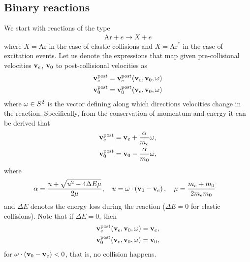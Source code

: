 \documentclass{article}[draft]
\begin{document}
\subsection{Binary reactions}
\label{subsec:binary_reactions}
We start with reactions of the type
\begin{align*}
\text{Ar} + e \longrightarrow X + e
\end{align*}
where $X = \text{Ar}$ in the case of elastic collisions and $X = \text{Ar}^\ast$ in the case of excitation events. Let us denote the expressions that map given pre-collisional velocities $\mathbf{v}_e$, $\mathbf{v}_0$ to post-collisional velocities as 
\begin{align*}
\vect{v}_e^\text{post} &= \vect{v}_e^\text{post} \of{\vect{v}_e, \vect{v}_0, \vect{\omega}}
\\
\vect{v}_0^\text{post} &= \vect{v}_0^\text{post} \of{\vect{v}_e, \vect{v}_0, \vect{\omega}}
\end{align*} 
where $\mathbf{\omega} \in S^2$ is the vector defining along which directions velocities change in the reaction. Specifically, from the conservation of momentum and energy it can be derived that
\begin{align*}
\mathbf{v}_e^\text{post} &= \mathbf{v}_e + \frac{\alpha}{m_e}\mathbf{\omega},
\\
\mathbf{v}_0^\text{post} &= \mathbf{v}_0 - \frac{\alpha}{m_0}\mathbf{\omega},
\end{align*}
where
\begin{align*}
\alpha &= \frac{u + \sqrt{u^2 - 4 \Delta E \mu}}{2\mu},
\quad 
u = \mathbf{\omega} \cdot \left( \mathbf{v}_0 - \mathbf{v}_e \right),
\quad 
\mu = \frac{m_e+m_0}{2 m_e m_0}
\end{align*}
and $\Delta E$ denotes the energy loss during the reaction ($\Delta E = 0$ for elastic collisions). Note that if $\Delta E=0$, then
\begin{align*}
\vect{v}_e^\text{post} \of{\vect{v}_e, \vect{v}_0, \vect{\omega}} = \vect{v}_e,
\\
\vect{v}_0^\text{post} \of{\vect{v}_e, \vect{v}_0, \vect{\omega}} = \vect{v}_0,
\end{align*} 
for $\mathbf{\omega} \cdot \left( \mathbf{v}_0 - \mathbf{v}_e \right) < 0$, that is, no collision happens.
\end{document}

